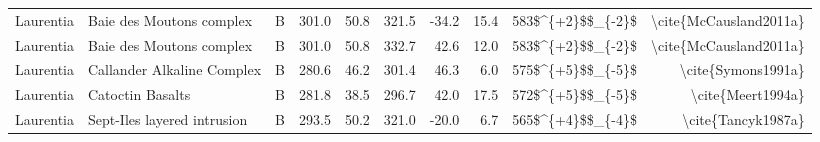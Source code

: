 \begin{longtable}{p{1 in}p{1 in}rrrrrrrr}
                     Laurentia &                         Baie des Moutons complex &      B &     301.0 &      50.8 & 321.5 & -34.2 &      15.4 &      583\$\textasciicircum \{+2\}\$\$\_\{-2\}\$ &                             \textbackslash cite\{McCausland2011a\} \\
                     Laurentia &                         Baie des Moutons complex &      B &     301.0 &      50.8 & 332.7 &  42.6 &      12.0 &      583\$\textasciicircum \{+2\}\$\$\_\{-2\}\$ &                             \textbackslash cite\{McCausland2011a\} \\
                     Laurentia &                       Callander Alkaline Complex &      B &     280.6 &      46.2 & 301.4 &  46.3 &       6.0 &      575\$\textasciicircum \{+5\}\$\$\_\{-5\}\$ &                                 \textbackslash cite\{Symons1991a\} \\
                     Laurentia &                                 Catoctin Basalts &      B &     281.8 &      38.5 & 296.7 &  42.0 &      17.5 &      572\$\textasciicircum \{+5\}\$\$\_\{-5\}\$ &                                  \textbackslash cite\{Meert1994a\} \\
                     Laurentia &                      Sept-Iles layered intrusion &      B &     293.5 &      50.2 & 321.0 & -20.0 &       6.7 &      565\$\textasciicircum \{+4\}\$\$\_\{-4\}\$ &                                 \textbackslash cite\{Tancyk1987a\} \\
\end{longtable}
